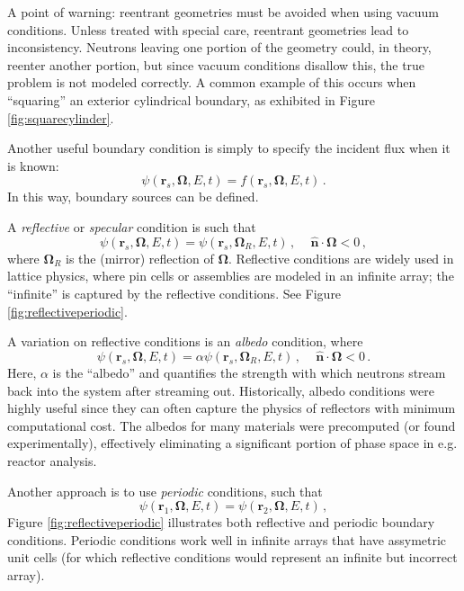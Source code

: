 A point of warning: reentrant geometries must be avoided when using vacuum conditions.  Unless treated with special care, reentrant geometries lead to inconsistency.  Neutrons leaving one portion of the geometry could, in theory, reenter another portion, but since vacuum conditions disallow this, the true problem is not modeled correctly.  A common example of this occurs when ``squaring'' an exterior cylindrical boundary, as exhibited in Figure \ref{fig:squarecylinder}.

Another useful boundary condition is simply to specify the incident flux when it is known:
\begin{equation}
 \psi(\mathbf{r}_s,\mathbf{\Omega},E,t) = f(\mathbf{r}_s,\mathbf{\Omega},E,t) \, .
\end{equation}
In this way, boundary sources can be defined.

A \textit{reflective} or \textit{specular} condition is such that 
\begin{equation}
 \psi(\mathbf{r}_s,\mathbf{\Omega},E,t) = \psi(\mathbf{r}_s,\mathbf{\Omega}_R,E,t) \, , \, \, \, \,  \, \, \, \mathbf{\hat{n}} \cdot \mathbf{\Omega} < 0 \, ,
\end{equation}
where $\mathbf{\Omega}_R$ is the (mirror) reflection of $\mathbf{\Omega}$.  Reflective conditions are widely used in lattice physics, where pin cells or assemblies are modeled in an infinite array; the ``infinite'' is captured by the reflective conditions.  See Figure \ref{fig:reflectiveperiodic}.

A variation on reflective conditions is an \textit{albedo} condition, where
\begin{equation}
 \psi(\mathbf{r}_s,\mathbf{\Omega},E,t) = \alpha \psi(\mathbf{r}_s,\mathbf{\Omega}_R,E,t) \, , \, \, \, \,  \, \, \, \mathbf{\hat{n}} \cdot \mathbf{\Omega} < 0 \, .
\end{equation}
Here, $\alpha$ is the ``albedo'' and quantifies the strength with which neutrons stream back into the system after streaming out.  Historically, albedo conditions were highly useful since they can often capture the physics of reflectors with minimum computational cost.  The albedos for many materials were precomputed (or found experimentally), effectively eliminating a significant portion of phase space in e.g. reactor analysis.

Another approach is to use \textit{periodic} conditions, such that
\begin{equation}
 \psi(\mathbf{r}_1,\mathbf{\Omega},E,t) = \psi(\mathbf{r}_2,\mathbf{\Omega},E,t) \, ,
\end{equation}
Figure \ref{fig:reflectiveperiodic} illustrates both reflective and periodic boundary conditions.  Periodic conditions work well in infinite arrays that have assymetric unit cells (for which reflective conditions would represent an infinite but incorrect array).

